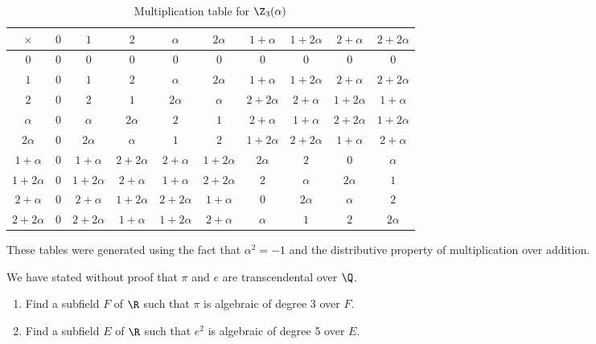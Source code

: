 \begin{solution}[(ii)]
  \begin{table}[H]
    \begin{center}
      \begin{tabular}{c||ccccccccc}
        $\times$ & $0$ & $1$ & $2$ & $\alpha$ & $2\alpha$ & $1+\alpha$ & $1+2\alpha$ & $2+\alpha$ & $2+2\alpha$\\
        \hline\hline
        $0$ & $0$ & $0$ & $0$ & $0$ & $0$ & $0$ & $0$ & $0$ & $0$ \\
        \hline
        $1$ & $0$ & $1$ & $2$ & $\alpha$ & $2\alpha$ & $1+\alpha$ & $1+2\alpha$ & $2+\alpha$ & $2+2\alpha$ \\
        \hline
        $2$ & $0$ & $2$ & $1$ & $2\alpha$ & $\alpha$ & $2+2\alpha$ & $2+\alpha$ & $1+2\alpha$ & $1+\alpha$ \\
        \hline
        $\alpha$ & $0$ & $\alpha$ & $2\alpha$ & $2$ & $1$ & $2+\alpha$ & $1+\alpha$ & $2+2\alpha$ & $1+2\alpha$ \\
        \hline
        $2\alpha$ & $0$ & $2\alpha$ & $\alpha$ & $1$ & $2$ & $1+2\alpha$ & $2+2\alpha$ & $1+\alpha$ & $2+\alpha$ \\  
        \hline 
        $1+\alpha$ & $0$ & $1+\alpha$ & $2+2\alpha$ & $2+\alpha$ & $1+2\alpha$ & $2\alpha$ & $2$ & $0$ & $\alpha$ \\ 
        \hline 
        $1+2\alpha$ & $0$ & $1+2\alpha$ & $2+\alpha$ & $1+\alpha$ & $2+2\alpha$ & $2$ & $\alpha$ & $2\alpha$ & $1$ \\  
        \hline 
        $2+\alpha$ & $0$ & $2+\alpha$ & $1+2\alpha$ & $2+2\alpha$ & $1+\alpha$ & $0$ & $2\alpha$ & $\alpha$ & $2$ \\ 
        \hline
        $2+2\alpha$ & $0$ & $2+2\alpha$ & $1+\alpha$ & $1+2\alpha$ & $2+\alpha$ & $\alpha$ & $1$ & $2$ & $2\alpha$ 
      \end{tabular}
      \caption{Multiplication table for $\Z_3(\alpha)$}
    \end{center}
  \end{table}

  These tables were generated using the fact that $\alpha^2 = -1$ and the distributive property of multiplication over addition.
\end{solution}

\begin{problem}[39.24]
  We have stated without proof that $\pi$ and $e$ are transcendental over $\Q$.
  \begin{enumerate}
    \item Find a subfield $F$ of $\R$ such that $\pi$ is algebraic of degree 3 over $F$.
    \item Find a subfield $E$ of $\R$ such that $e^2$ is algebraic of degree 5 over $E$.
  \end{enumerate}
\end{problem}

